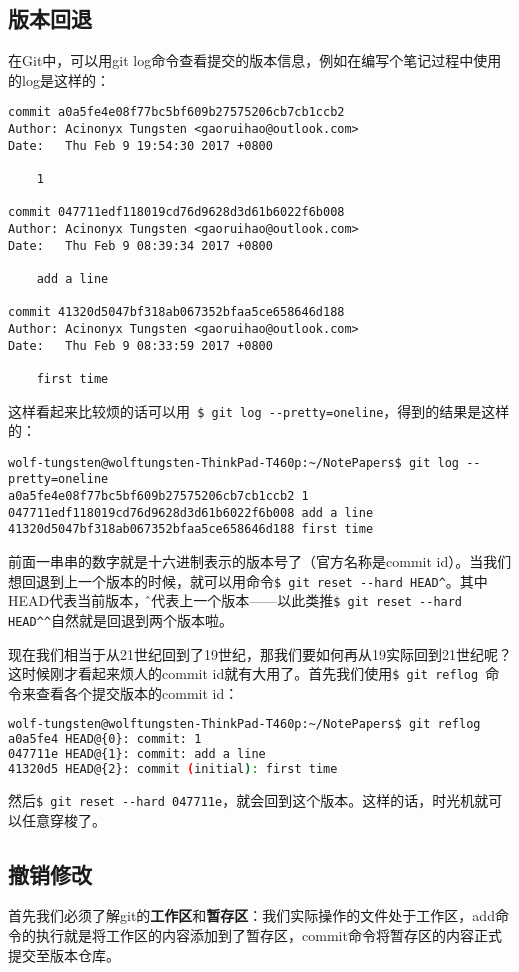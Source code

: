 \documentclass[UTF8]{ctexart}
\begin{document}
\subsection{版本回退}
在Git中，可以用git log命令查看提交的版本信息，例如在编写个笔记过程中使用的log是这样的：
\begin{verbatim}
commit a0a5fe4e08f77bc5bf609b27575206cb7cb1ccb2
Author: Acinonyx Tungsten <gaoruihao@outlook.com>
Date:   Thu Feb 9 19:54:30 2017 +0800

    1

commit 047711edf118019cd76d9628d3d61b6022f6b008
Author: Acinonyx Tungsten <gaoruihao@outlook.com>
Date:   Thu Feb 9 08:39:34 2017 +0800

    add a line

commit 41320d5047bf318ab067352bfaa5ce658646d188
Author: Acinonyx Tungsten <gaoruihao@outlook.com>
Date:   Thu Feb 9 08:33:59 2017 +0800

    first time
\end{verbatim}

这样看起来比较烦的话可以用\verb！ $ git log --pretty=oneline！，得到的结果是这样的：
\begin{verbatim}
wolf-tungsten@wolftungsten-ThinkPad-T460p:~/NotePapers$ git log --pretty=oneline
a0a5fe4e08f77bc5bf609b27575206cb7cb1ccb2 1
047711edf118019cd76d9628d3d61b6022f6b008 add a line
41320d5047bf318ab067352bfaa5ce658646d188 first time
\end{verbatim}

前面一串串的数字就是十六进制表示的版本号了（官方名称是commit id）。当我们想回退到上一个版本的时候，就可以用命令\verb!$ git reset --hard HEAD^!。其中HEAD代表当前版本，\^就代表上一个版本——以此类推\verb!$ git reset --hard HEAD^^!自然就是回退到两个版本啦。

现在我们相当于从21世纪回到了19世纪，那我们要如何再从19实际回到21世纪呢？这时候刚才看起来烦人的commit id就有大用了。首先我们使用\verb!$ git reflog !命令来查看各个提交版本的commit id：
\begin{lstlisting}[language=bash]
wolf-tungsten@wolftungsten-ThinkPad-T460p:~/NotePapers$ git reflog
a0a5fe4 HEAD@{0}: commit: 1
047711e HEAD@{1}: commit: add a line
41320d5 HEAD@{2}: commit (initial): first time
\end{lstlisting}
然后\verb!$ git reset --hard 047711e!，就会回到这个版本。这样的话，时光机就可以任意穿梭了。

\subsection{撤销修改}
首先我们必须了解git的\textbf{工作区}和\textbf{暂存区}：我们实际操作的文件处于工作区，add命令的执行就是将工作区的内容添加到了暂存区，commit命令将暂存区的内容正式提交至版本仓库。
\end{document}
